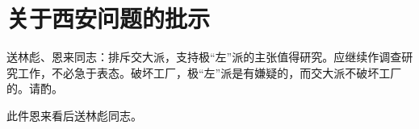 \section[关于西安问题的批示（一九六七年二月十四日）]{关于西安问题的批示}


送林彪、恩来同志：排斥交大派，支持极“左”派的主张值得研究。应继续作调查研究工作，不必急于表态。破坏工厂，极“左”派是有嫌疑的，而交大派不破坏工厂的。请酌。

此件恩来看后送林彪同志。


